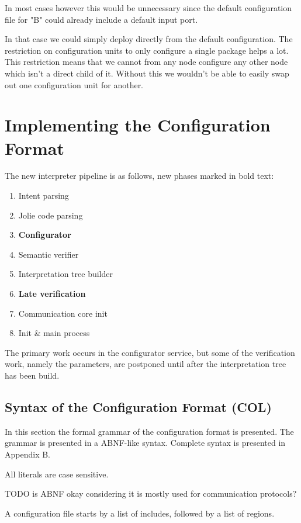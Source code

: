 In most cases however this would be unnecessary since the default
configuration file for "B" could already include a default input port.

In that case we could simply deploy directly from the default configuration.
The restriction on configuration units to only configure a single package helps
a lot. This restriction means that we cannot from any node configure any other
node which isn't a direct child of it. Without this we wouldn't be able to
easily swap out one configuration unit for another.

\section{Implementing the Configuration Format}
\label{sec:col_impl}

The new interpreter pipeline is as follows, new phases marked in bold text:

\begin{enumerate}
\item Intent parsing
\item Jolie code parsing
\item \textbf{Configurator}
\item Semantic verifier
\item Interpretation tree builder
\item \textbf{Late verification}
\item Communication core init
\item Init \& main process
\end{enumerate}

The primary work occurs in the configurator service, but some of the
verification work, namely the parameters, are postponed until after the
interpretation tree has been build.

\subsection{Syntax of the Configuration Format (COL)}

In this section the formal grammar of the configuration format is presented.
The grammar is presented in a ABNF-like syntax. Complete syntax is presented in
Appendix B.

All literals are case sensitive.

TODO is ABNF okay considering it is mostly used for communication protocols?

A configuration file starts by a list of includes, followed by a list of
regions.

